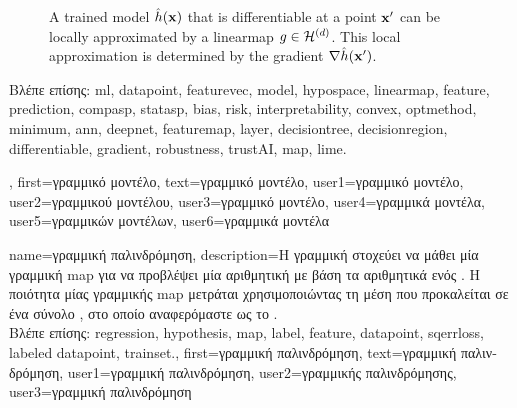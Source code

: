 {{\begin{figure}[H]
\begin{center}
\begin{tikzpicture}[x=0.5cm]
		\end{tikzpicture}
		\vspace*{-5mm}
		\end{center}
		\caption{A trained \gls{model} $\learnthypothesis(\featurevec)$ that is \gls{differentiable} at a point $\featurevec'$ 
		can be locally approximated by a \gls{linearmap} $g \in \linmodel{\nrfeatures}$. This local approximation 
		is determined by the \gls{gradient} $\nabla \learnthypothesis(\featurevec')$.}
		\label{fig_linapprox_dict}
		\end{figure}
		\foreignlanguage{greek}{Βλέπε επίσης:} \gls{ml}, \gls{datapoint}, \gls{featurevec}, \gls{model}, \gls{hypospace}, \gls{linearmap}, \gls{feature}, 
		\gls{prediction}, \gls{compasp}, \gls{statasp}, \gls{bias}, \gls{risk}, \gls{interpretability}, \gls{convex}, \gls{optmethod}, \gls{minimum}, \gls{ann}, 
		\gls{deepnet}, \gls{featuremap}, \gls{layer}, \gls{decisiontree}, \gls{decisionregion}, \gls{differentiable}, \gls{gradient}, \gls{robustness}, \gls{trustAI}, 
		\gls{map}, \gls{lime}.}, 
	first={\foreignlanguage{greek}{γραμμικό μοντέλο}},
   	text={\foreignlanguage{greek}{γραμμικό μοντέλο}},
   	user1={\foreignlanguage{greek}{γραμμικό μοντέλο}}, %
   	user2={\foreignlanguage{greek}{γραμμικού μοντέλου}}, %
   	user3={\foreignlanguage{greek}{γραμμικό μοντέλο}}, %
   	user4={\foreignlanguage{greek}{γραμμικά μοντέλα}}, %
   	user5={\foreignlanguage{greek}{γραμμικών μοντέλων}}, %
   	user6={\foreignlanguage{greek}{γραμμικά μοντέλα}} %
}

{name={\foreignlanguage{greek}{γραμμική παλινδρόμηση}}, 
	description={\foreignlanguage{greek}{Η γραμμική} 
		 \foreignlanguage{greek}{στοχεύει να μάθει μία γραμμική} \gls{map}  
		\foreignlanguage{greek}{για να προβλέψει μία αριθμητική}  \foreignlanguage{greek}{με βάση τα αριθμητικά} 
		 \foreignlanguage{greek}{ενός} . \foreignlanguage{greek}{Η ποιότητα μίας γραμμικής} 
		\gls{map}  \foreignlanguage{greek}{μετράται χρησιμοποιώντας τη μέση}  
		 \foreignlanguage{greek}{που προκαλείται σε ένα σύνολο} , 
		\foreignlanguage{greek}{στο οποίο αναφερόμαστε ως το} .\\
		\foreignlanguage{greek}{Βλέπε επίσης:} \gls{regression}, \gls{hypothesis}, \gls{map}, \gls{label}, \gls{feature}, \gls{datapoint},  \gls{sqerrloss}, 
		\gls{labeled datapoint}, \gls{trainset}.},
	first={\foreignlanguage{greek}{γραμμική παλινδρόμηση}},
	text={\foreignlanguage{greek}{γραμμική παλινδρόμηση}},
	user1={\foreignlanguage{greek}{γραμμική παλινδρόμηση}}, %
	user2={\foreignlanguage{greek}{γραμμικής παλινδρόμησης}}, %
	user3={\foreignlanguage{greek}{γραμμική παλινδρόμηση}} %
}

